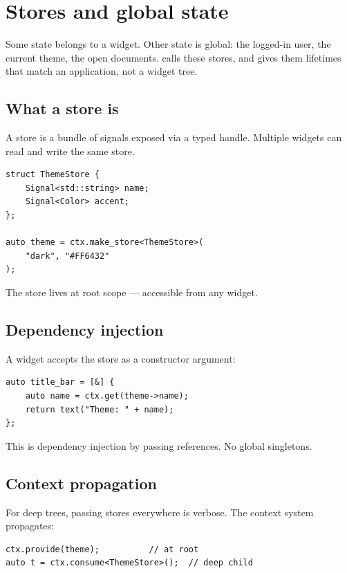 \chapter{Stores and global state}
\label{ch:stores}

\begin{aside}
Some state belongs to a widget. Other state is global: the
logged-in user, the current theme, the open documents. \maya{}
calls these stores, and gives them lifetimes that match an
application, not a widget tree.
\end{aside}

\section{What a store is}

A store is a bundle of signals exposed via a typed handle.
Multiple widgets can read and write the same store.

\begin{lstlisting}
struct ThemeStore {
    Signal<std::string> name;
    Signal<Color> accent;
};

auto theme = ctx.make_store<ThemeStore>(
    "dark", "#FF6432"
);
\end{lstlisting}

The store lives at root scope --- accessible from any widget.

\section{Dependency injection}

A widget accepts the store as a constructor argument:

\begin{lstlisting}
auto title_bar = [&] {
    auto name = ctx.get(theme->name);
    return text("Theme: " + name);
};
\end{lstlisting}

This is dependency injection by passing references. No
global singletons.

\section{Context propagation}

For deep trees, passing stores everywhere is verbose. The
context system propagates:

\begin{lstlisting}
ctx.provide(theme);          // at root
auto t = ctx.consume<ThemeStore>();  // deep child
\end{lstlisting}

